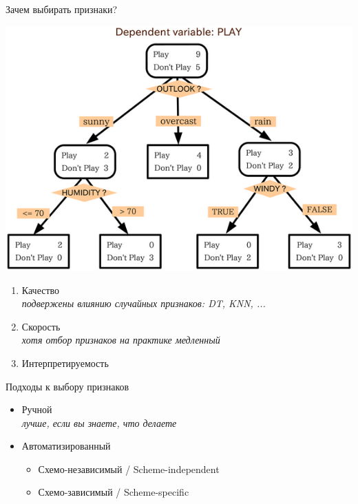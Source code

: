 \documentclass[10pt,a4paper]{beamer}
\begin{document}

\begin{frame}{Зачем выбирать признаки?}

\begin{center}
\includegraphics[scale=0.3]{images/dt.png}
\end{center}

\begin{enumerate}
\item Качество \\
{\it подвержены влиянию случайных признаков: DT, KNN, ...}
\item Скорость \\
{\it хотя отбор признаков на практике медленный}
\item Интерпретируемость
\end{enumerate}

\end{frame}


\begin{frame}{Подходы к выбору признаков}

\begin{itemize}
\item Ручной \\
{\it лучше, если вы знаете, что делаете}
\item Автоматизированный \\
\begin{itemize}
\item Схемо-независимый / Scheme-independent
\item Схемо-зависимый / Scheme-specific
\end{itemize}
\end{itemize}

\end{frame}
\end{document}
